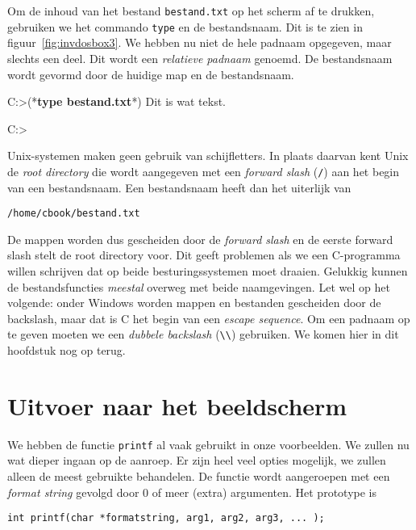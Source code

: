 Om de inhoud van het bestand \texttt{bestand.txt} op het scherm af te drukken, gebruiken we het commando \texttt{type} en de bestandsnaam. Dit is te zien in figuur~\ref{fig:invdosbox3}. We hebben nu niet de hele padnaam opgegeven, maar slechts een deel. Dit wordt een \textsl{relatieve padnaam} genoemd. De bestandsnaam wordt gevormd door de huidige map en de bestandsnaam.

\begin{dosbox}[title=Afdrukken van een bestand.,label=fig:invdosbox3]
C:\Users\Cbook>(*\textbf{type bestand.txt}*)
Dit is wat tekst.

C:\Users\Cbook>
\end{dosbox}

Unix-systemen maken geen gebruik van schijfletters. In plaats daarvan kent Unix de \textsl{root directory} die wordt aangegeven met een \textsl{forward slash} (\texttt{/}) aan het begin van een bestandsnaam. Een bestandsnaam heeft dan het uiterlijk van

\begin{lstlisting}[style=lstoneline]
/home/cbook/bestand.txt
\end{lstlisting}

De mappen worden dus gescheiden door de \textsl{forward slash} en de eerste forward slash stelt de root directory voor. Dit geeft problemen als we een C-programma willen schrijven dat op beide besturingssystemen moet draaien. Gelukkig kunnen de bestandsfuncties \textsl{meestal} overweg met beide naamgevingen. Let wel op het volgende: onder Windows worden mappen en bestanden gescheiden door de backslash, maar dat is C het begin van een \textsl{escape sequence}. Om een padnaam op te geven moeten we een \textsl{dubbele backslash} (\texttt{\textbackslash\textbackslash}) gebruiken. We komen hier in dit hoofdstuk nog op terug.


\section{Uitvoer naar het beeldscherm}
\label{sec:iouitvoernaarbeeldscherm}
We hebben de functie \texttt{printf} al vaak gebruikt in onze voorbeelden. We zullen nu wat dieper ingaan op de aanroep. Er zijn heel veel opties mogelijk, we zullen alleen de meest gebruikte behandelen. De functie wordt aangeroepen met een \textsl{format string} gevolgd door 0 of meer (extra) argumenten. Het prototype is

\begin{lstlisting}[style=lstoneline]
int printf(char *formatstring, arg1, arg2, arg3, ... );
\end{lstlisting}

